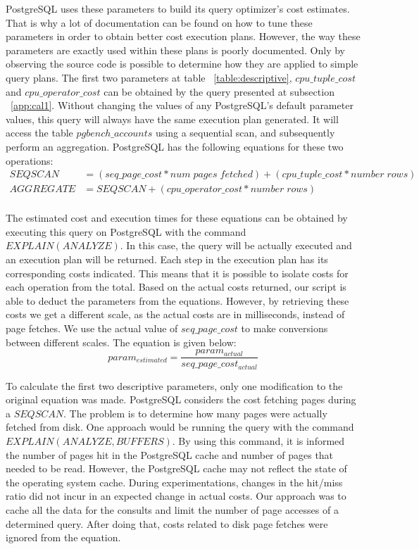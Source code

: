 PostgreSQL uses these parameters to build its query optimizer's cost estimates. That is why a lot of documentation can be found on how to tune these parameters in order to obtain better cost execution plans. However, the way these parameters are exactly used within these plans is poorly documented. Only by observing the source code is possible to determine how they are applied to simple query plans. The first two parameters at table ~\ref{table:descriptive}, $cpu\_tuple\_cost$ and $cpu\_operator\_cost$ can be obtained by the query presented at subsection ~\ref{app:cal1}. Without changing the values of any PostgreSQL's default parameter values, this query will always have the same execution plan generated. It will access the table $pgbench\_accounts$ using a sequential scan, and subsequently perform an aggregation. PostgreSQL has the following equations for these two operations:
\begin{equation}
  \begin{split}
      SEQSCAN &= ( seq\_page\_cost * num\; pages \; fetched ) + ( cpu\_tuple\_cost * number\; rows ) \\
      AGGREGATE &= SEQSCAN + ( cpu\_operator\_cost * number\; rows) \\
  \end{split}
\end{equation}

The estimated cost and execution times for these equations can be obtained by executing this query on PostgreSQL with the command $EXPLAIN (ANALYZE)$. In this case, the query will be actually executed and an execution plan will be returned. Each step in the execution plan has its corresponding costs indicated. This means that it is possible to isolate costs for each operation from the total. Based on the actual costs returned, our script is able to deduct the parameters from the equations. However, by retrieving these costs we get a different scale, as the actual costs are in milliseconds, instead of page fetches. We use the actual value of $seq\_page\_cost$ to make conversions between different scales. The equation is given below:
\[
 param_{estimated} = \frac{param_{actual}}{seq\_page\_cost_{actual}}
\]

To calculate the first two descriptive parameters, only one modification to the original equation was made. PostgreSQL considers the cost fetching pages  during a $SEQSCAN$. The problem is to determine how many pages were actually fetched from disk. One approach would be running the query with the command $EXPLAIN (ANALYZE,BUFFERS)$. By using this command, it is informed the number of pages hit in the PostgreSQL cache and number of pages that needed to be read. However, the PostgreSQL cache may not reflect the state of the operating system cache. During experimentations, changes in the hit/miss ratio did not incur in an expected change in actual costs. Our approach was to cache all the data for the consults and limit the number of page accesses of a determined query. After doing that, costs related to disk page fetches were ignored from the equation.

